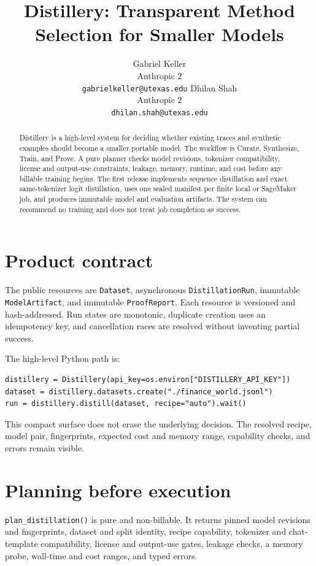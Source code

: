 \documentclass{article}
\title{Distillery: Transparent Method Selection for Smaller Models}
\author{
Gabriel Keller \\
Anthropic 2 \\
\texttt{gabrielkeller@utexas.edu}
\And
Dhilan Shah \\
Anthropic 2 \\
\texttt{dhilan.shah@utexas.edu}
}
\begin{document}
\maketitle

\begin{abstract}
Distillery is a high-level system for deciding whether existing traces and synthetic examples should become a smaller portable model. The workflow is Curate, Synthesize, Train, and Prove. A pure planner checks model revisions, tokenizer compatibility, license and output-use constraints, leakage, memory, runtime, and cost before any billable training begins. The first release implements sequence distillation and exact same-tokenizer logit distillation, uses one sealed manifest per finite local or SageMaker job, and produces immutable model and evaluation artifacts. The system can recommend no training and does not treat job completion as success.
\end{abstract}

\section{Product contract}
The public resources are \texttt{Dataset}, asynchronous \texttt{DistillationRun}, immutable \texttt{ModelArtifact}, and immutable \texttt{ProofReport}. Each resource is versioned and hash-addressed. Run states are monotonic, duplicate creation uses an idempotency key, and cancellation races are resolved without inventing partial success.

The high-level Python path is:
\begin{verbatim}
distillery = Distillery(api_key=os.environ["DISTILLERY_API_KEY"])
dataset = distillery.datasets.create("./finance_world.jsonl")
run = distillery.distill(dataset, recipe="auto").wait()
\end{verbatim}
This compact surface does not erase the underlying decision. The resolved recipe, model pair, fingerprints, expected cost and memory range, capability checks, and errors remain visible.

\section{Planning before execution}
\texttt{plan\_distillation()} is pure and non-billable. It returns pinned model revisions and fingerprints, dataset and split identity, recipe capability, tokenizer and chat-template compatibility, license and output-use gates, leakage checks, a memory probe, wall-time and cost ranges, and typed errors.
\end{document}
